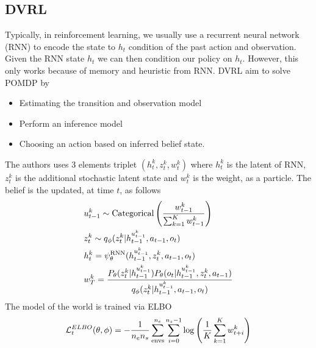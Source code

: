 \subsection{DVRL}
Typically, in reinforcement learning, we usually use a recurrent neural network (RNN) to encode the state to $h_t$ condition of the past action and observation. Given the RNN state $h_t$ we can then condition our policy on $h_t$. However, this only works because of memory and heuristic from RNN. DVRL aim to solve POMDP by 
\begin{itemize}
    \item Estimating the transition and observation model 
    \item Perform an inference model 
    \item Choosing an action based on inferred belief state.
\end{itemize}
The authors uses 3 elements triplet $(h^k_t, z^k_t, w^k_t)$ where $h^k_t$ is the latent of RNN, $z^k_t$ is the additional stochastic latent state and $w^k_t$ is the weight, as a particle. The belief is the updated, at time $t$, as follows 
\begin{equation}
\begin{aligned}
    &u^k_{t-1} \sim \text{Categorical}\left( \frac{w^k_{t-1}}{\sum^K_{k=1}w^k_{t-1}} \right) \\
    &z^k_{t} \sim q_{\phi}(z^k_t | h^{u^k_{t-1}}_{t-1}, a_{t-1}, o_t) \\
    &h^k_t = \psi^{\text{RNN}}_\theta (h^{u^k_{t-1}}_{t-1}, z^k_t, a_{t-1}, o_t) \\
    &w^k_T = \frac{P_\theta(z^k_t | h^{u^k_{t-1}}_{t-1}) P_\theta(o_t | h^{u^k_{t-1}}_{t-1}, z^k_t, a_{t-1})}{q_\phi(z^k_t | h^{u^k_{t-1}}_{t-1}, a_{t-1}, o_t)}
\end{aligned}
\end{equation}
The model of the world is trained via ELBO 
\begin{equation}
    \mathcal{L}^{ELBO}_{t}(\theta, \phi) = -\frac{1}{n_en_s} \sum^{n_e}_{\text{envs}} \sum^{n_s - 1}_{i=0} \log \left( \frac{1}{K}\sum^K_{k=1}w^k_{t+i} \right)
\end{equation}
